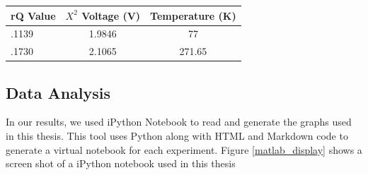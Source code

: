 \begin{table}[h!tb] \centering
{}
\label{exp1_datapoints}
\begin{tabular}{lcc} \hline
\textbf{rQ Value} & \textbf{$X^2$ Voltage (V)} & \textbf{Temperature (K)} \\ \hline
.1139 & 1.9846 & 77 \\
.1730 & 2.1065 & 271.65 \\ \hline
\end{tabular}
\end{table}

\subsection{Data Analysis}\label{Exp1_analysis}

In our results, we used iPython Notebook to read and generate the graphs used in this thesis.  This tool uses Python along with HTML and Markdown code to generate a virtual notebook for each experiment.  Figure \ref{matlab_display} shows a screen shot of a iPython notebook used in this thesis

